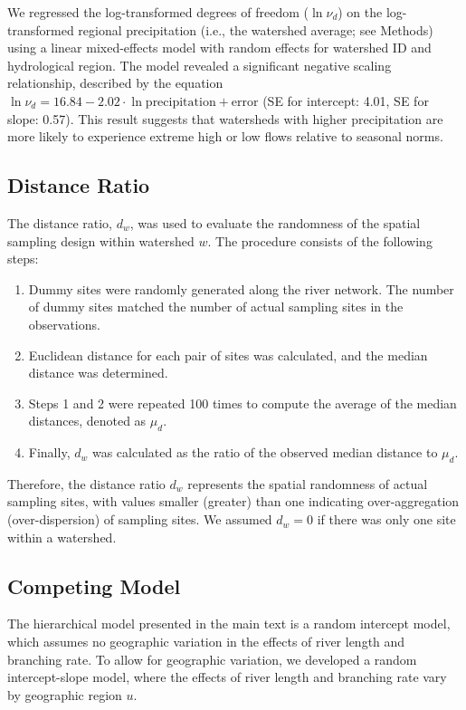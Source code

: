 \documentclass[11pt, class=article, crop=false]{standalone}
\theoremstyle{definition}
\begin{document}
We regressed the log-transformed degrees of freedom ($\ln \nu_d$) on the log-transformed regional precipitation (i.e., the watershed average; see Methods) using a linear mixed-effects model with random effects for watershed ID and hydrological region.
The model revealed a significant negative scaling relationship, described by the equation $\ln \nu_d = 16.84 - 2.02 \cdot \ln \text{precipitation} + \text{error}$ (SE for intercept: 4.01, SE for slope: 0.57).
This result suggests that watersheds with higher precipitation are more likely to experience extreme high or low flows relative to seasonal norms.

\subsection{Distance Ratio}

The distance ratio, $d_{w}$, was used to evaluate the randomness of the spatial sampling design within watershed $w$.
The procedure consists of the following steps:

\begin{enumerate}
    \item Dummy sites were randomly generated along the river network. The number of dummy sites matched the number of actual sampling sites in the observations.
    \item Euclidean distance for each pair of sites was calculated, and the median distance was determined.
    \item Steps 1 and 2 were repeated 100 times to compute the average of the median distances, denoted as $\mu_d$.
    \item Finally, $d_{w}$ was calculated as the ratio of the observed median distance to $\mu_d$.
\end{enumerate}

Therefore, the distance ratio $d_{w}$ represents the spatial randomness of actual sampling sites, with values smaller (greater) than one indicating over-aggregation (over-dispersion) of sampling sites.
We assumed $d_{w} = 0$ if there was only one site within a watershed.

\subsection{Competing Model}

The hierarchical model presented in the main text is a random intercept model, which assumes no geographic variation in the effects of river length and branching rate. To allow for geographic variation, we developed a random intercept-slope model, where the effects of river length and branching rate vary by geographic region $u$.
\end{document}
